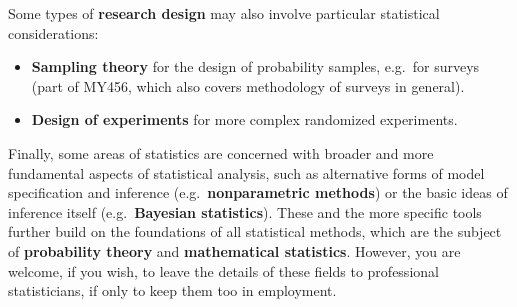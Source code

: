 Some types of \textbf{research design} may also involve particular
statistical considerations:
\begin{itemize}
\item
\textbf{Sampling theory} for the design of probability
samples, e.g.\  for surveys (part of MY456, which also covers
methodology of surveys in general).
\item
\textbf{Design of experiments} for more complex randomized experiments.
\end{itemize}

Finally, some areas of statistics are concerned with broader and more
fundamental aspects of statistical analysis, such as alternative forms
of model specification and inference (e.g.\ \textbf{nonparametric
methods}) or the basic ideas of inference itself (e.g.\ \textbf{Bayesian
statistics}). These and the more specific tools further build on the
foundations of all statistical methods, which are the subject of
\textbf{probability theory} and \textbf{mathematical statistics}.
However, you are welcome, if you wish, to leave the details of these
fields to professional statisticians, if only to keep them too in
employment.
